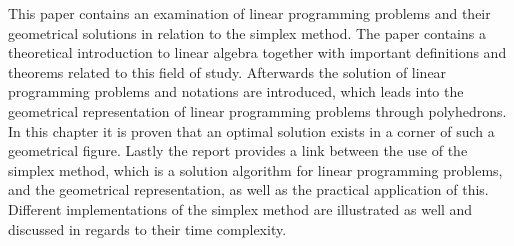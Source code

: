 This paper contains an examination of linear programming problems and their geometrical solutions in relation to the simplex method. 
The paper contains a theoretical introduction to linear algebra together with important definitions and theorems related to this field of study. 
Afterwards the solution of linear programming problems and notations are introduced, which leads into the geometrical representation of linear programming problems through polyhedrons.
In this chapter it is proven that an optimal solution exists in a corner of such a geometrical figure.
Lastly the report provides a link between the use of the simplex method, which is a solution algorithm for linear programming problems, and the geometrical representation, as well as the practical application of this.
Different implementations of the simplex method are illustrated as well and discussed in regards to their time complexity. 
